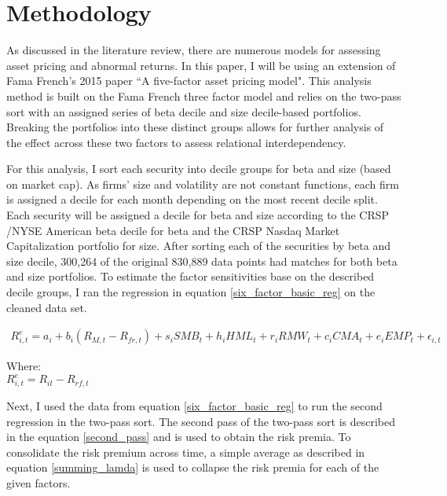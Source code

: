 \documentclass[12pt,oneside,reqno]{amsart}
\begin{document}
 

 
\section{Methodology}
\label{Methodology}
As discussed in the literature review, there are numerous models for assessing asset pricing and abnormal returns. In this paper, I will be using an extension of Fama French's 2015 paper ``A five-factor asset pricing model". This analysis method is built on the Fama French three factor model and relies on the two-pass sort with an assigned series of beta decile and size decile-based portfolios. Breaking the portfolios into these distinct groups allows for further analysis of the effect across these two factors to assess relational interdependency. 

For this analysis, I sort each security into decile groups for beta and size (based on market cap). As firms' size and volatility are not constant functions, each firm is assigned a decile for each month depending on the most recent decile split.  Each security will be assigned a decile for beta and size according to the CRSP /NYSE American beta decile for beta and the CRSP Nasdaq Market Capitalization portfolio for size. After sorting each of the securities by beta and size decile, 300,264 of the original 830,889 data points had matches for both beta and size portfolios. To estimate the factor sensitivities base on the described decile groups, I ran the regression in equation \eqref{six_factor_basic_reg} on the cleaned data set. 




\begin{equation}
\begin{split}
    R_{i,t}^e = a_i+b_i(R_{M,t}-R_{fr,t})+s_iSMB_t+ h_iHML_t+  r_iRMW_t+c_iCMA_t+e_iEMP_t +\epsilon_{i,t}
    \end{split}
    \label{six_factor_basic_reg}
\end{equation}

\begin{center}
Where:\\
    $R_{i,t}^e = R_{it}-R_{rf,t}$
\end{center}

Next, I used the data from equation \eqref{six_factor_basic_reg} to run the second regression in the two-pass sort. The second pass of the two-pass sort is described in the equation  \eqref{second_pass} and is used to obtain the risk premia. To consolidate the risk premium across time, a simple average as described in equation \eqref{summing_lamda} is used to collapse the risk premia for each of the given factors. 
\end{document}
